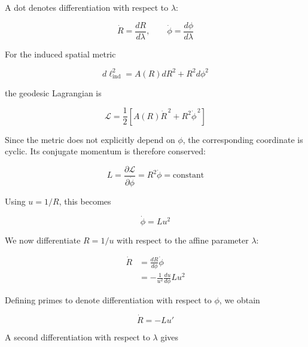 \documentclass[pdflatex,sn-mathphys-num]{sn-jnl}%
\theoremstyle{thmstyleone}%
\theoremstyle{thmstyletwo}%
\theoremstyle{thmstylethree}%
\begin{document}
\begin{appendices}
A dot denotes differentiation with respect to $\lambda$:

\begin{equation}
    \dot{R}=\frac{dR}{d\lambda},
    \qquad
    \dot{\phi}=\frac{d\phi}{d\lambda}
\end{equation}

For the induced spatial metric

\begin{equation}
    d\ell_{\mathrm{ind}}^2
    =
    A(R)dR^2+R^2d\phi^2
\end{equation}

the geodesic Lagrangian is

\begin{equation}
    \mathcal{L}
    =
    \frac{1}{2}
    \left[
        A(R)\dot{R}^{\,2}
        +
        R^2\dot{\phi}^{\,2}
    \right]
\end{equation}

Since the metric does not explicitly depend on $\phi$, the corresponding coordinate is cyclic. Its conjugate momentum is therefore conserved:

\begin{equation}
    L
    =
    \frac{\partial\mathcal{L}}{\partial\dot{\phi}}
    =
    R^2\dot{\phi}
    =
    \text{constant}
\end{equation}

Using $u=1/R$, this becomes

\begin{equation}
    \dot{\phi}=Lu^2
\end{equation}

We now differentiate $R=1/u$ with respect to the affine parameter $\lambda$:

\begin{equation}
    \begin{aligned}
        \dot{R}
        &=
        \frac{dR}{d\phi}\dot{\phi}\\
        &=
        -\frac{1}{u^2}
        \frac{du}{d\phi}
        Lu^2
    \end{aligned}
\end{equation}

Defining primes to denote differentiation with respect to $\phi$, we obtain

\begin{equation}
    \boxed{
        \dot{R}=-Lu'
    }
\end{equation}

A second differentiation with respect to $\lambda$ gives


\end{appendices}
\end{document}
